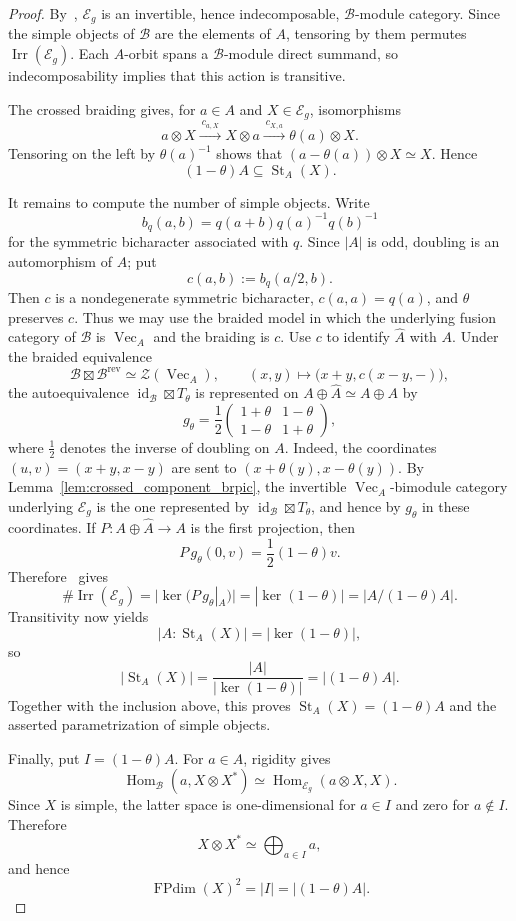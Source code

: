 \documentclass[12pt]{amsart}
\theoremstyle{plain}
\theoremstyle{definition} %
\theoremstyle{remark} %
\DeclareMathOperator{\VecCat}{Vec}
\newcommand{\Vect}[1]{\VecCat_{#1}}
\newcommand{\cB}{\mathcal{B}}
\newcommand{\cE}{\mathcal{E}}
\newcommand{\FPdim}{\operatorname{FPdim}}
\newcommand{\id}{\operatorname{id}}
\newcommand{\Irr}{\operatorname{Irr}}
\newcommand{\St}{\operatorname{St}}
\newcommand{\Hom}{\operatorname{Hom}}
\begin{document}
\begin{proof}
By~\cite[Theorem~6.1]{ENO10}, $\cE_g$ is an invertible, hence
indecomposable, $\cB$-module category. Since the simple objects of $\cB$
are the elements of $A$, tensoring by them permutes $\Irr(\cE_g)$. Each
$A$-orbit spans a $\cB$-module direct summand, so indecomposability implies
that this action is transitive.

The crossed braiding gives, for $a\in A$ and $X\in\cE_g$, isomorphisms
\[
a\otimes X\xrightarrow{\ c_{a,X}\ }X\otimes a
\xrightarrow{\ c_{X,a}\ }\theta(a)\otimes X.
\]
Tensoring on the left by $\theta(a)^{-1}$ shows that
$(a-\theta(a))\otimes X\simeq X$. Hence
\[
(1-\theta)A\subseteq\St_A(X).
\]

It remains to compute the number of simple objects. Write
\[
b_q(a,b)=q(a+b)q(a)^{-1}q(b)^{-1}
\]
for the symmetric bicharacter associated with $q$. Since $|A|$ is odd,
doubling is an automorphism of $A$; put
\[
c(a,b):=b_q(a/2,b).
\]
Then $c$ is a nondegenerate symmetric bicharacter, $c(a,a)=q(a)$, and
$\theta$ preserves $c$. Thus we may use the braided model in which the
underlying fusion category of $\cB$ is $\Vect{A}$ and the braiding is $c$.
Use $c$ to identify $\widehat A$ with $A$. Under the braided
equivalence
\[
\cB\boxtimes\cB^{\mathrm{rev}}\simeq\mathcal Z(\Vect{A}),
\qquad
(x,y)\longmapsto\bigl(x+y,c(x-y,-)\bigr),
\]
the autoequivalence $\id_{\cB}\boxtimes T_\theta$ is represented on
$A\oplus\widehat A\simeq A\oplus A$ by
\[
g_\theta=
\frac12
\begin{pmatrix}
1+\theta & 1-\theta\\
1-\theta & 1+\theta
\end{pmatrix},
\]
where $\frac12$ denotes the inverse of doubling on $A$. Indeed, the
coordinates $(u,v)=(x+y,x-y)$ are sent to
$(x+\theta(y),x-\theta(y))$. By Lemma~\ref{lem:crossed_component_brpic}, the invertible
$\Vect{A}$-bimodule category underlying $\cE_g$ is the one represented by
$\id_{\cB}\boxtimes T_\theta$, and hence by $g_\theta$ in these coordinates.
If $P:A\oplus\widehat A\to A$ is the first projection, then
\[
P\,g_\theta(0,v)=\frac12(1-\theta)v.
\]
Therefore~\cite[Proposition~10.8]{ENO10} gives
\[
\#\Irr(\cE_g)
=\bigl|\ker(P\,g_\theta|_{\widehat A})\bigr|
=|\ker(1-\theta)|
=|A/(1-\theta)A|.
\]
Transitivity now yields
\[
|A:\St_A(X)|=|\ker(1-\theta)|,
\]
so
\[
|\St_A(X)|=\frac{|A|}{|\ker(1-\theta)|}=|(1-\theta)A|.
\]
Together with the inclusion above, this proves
$\St_A(X)=(1-\theta)A$ and the asserted parametrization of simple
objects.

Finally, put $I=(1-\theta)A$. For $a\in A$, rigidity gives
\[
\Hom_{\cB}(a,X\otimes X^*)
\simeq
\Hom_{\cE_g}(a\otimes X,X).
\]
Since $X$ is simple, the latter space is one-dimensional for $a\in I$
and zero for $a\notin I$. Therefore
\[
X\otimes X^*\simeq\bigoplus_{a\in I}a,
\]
and hence
\[
\FPdim(X)^2=|I|=|(1-\theta)A|.
\]
\end{proof}
\end{document}
